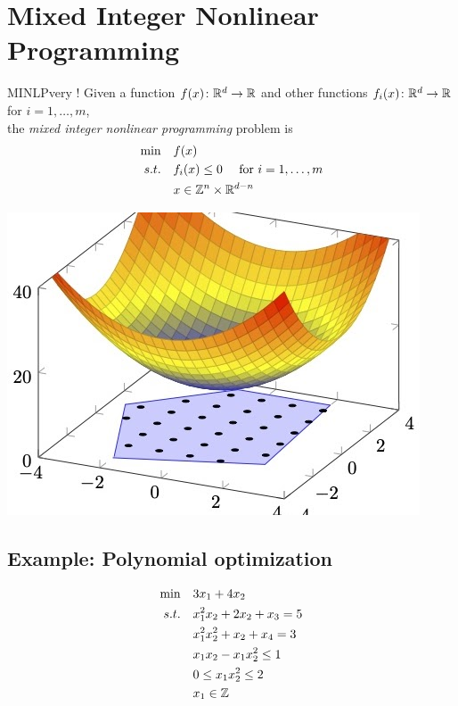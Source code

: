 \documentclass{article}
\renewcommand{\st}{s.t.}
\begin{document}
\newpage
\section{Mixed Integer Nonlinear Programming}
\begin{minipage}{0.5\textwidth}
\begin{general}{MINLP}{very \nphard!}
Given a function $f(x)\colon \mathbb{R}^d \to \mathbb{R}$ and other functions $f_i(x)\colon \mathbb{R}^d \to \mathbb{R}$ for $i=1, \dots, m$,  \\
the \emph{mixed integer nonlinear programming} problem is
\begin{equation}
\label{eq:convex-programming}
\begin{split}
\min \quad & f(x)\\
\st  \quad & f_i(x) \leq 0  \quad  \text{ for } i=1, \dots, m\\
& x \in \Z^n \times \R^{d-n}
\end{split}
\end{equation}
\end{general}
\end{minipage}
\begin{minipage}{0.5\textwidth}
\begin{center}
\includegraphics[scale = 0.3]{presentation_figures/minlp}
\end{center}
\end{minipage}


\newpage
\subsection{Example: Polynomial optimization}

\begin{equation}
\begin{split}
\min \quad & 3 x_1+4 x_2\\
s.t. \quad & x_1^2 x_2+2 x_2+x_3=5\\
&  x_1^2 x_2^2+x_2+x_4=3 \\
& x_1 x_2-x_1 x_2^2 \leq 1\\
  &0 \leq x_1 x_2^2 \leq 2\\
  &x_1 \in {\mathbb{Z}}
\end{split} 
\end{equation}
\end{document}
